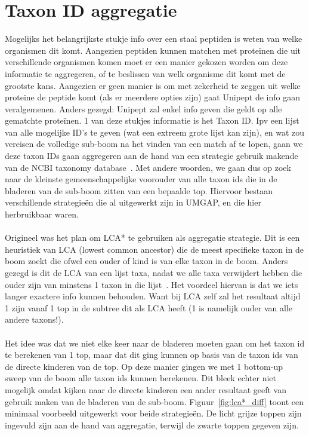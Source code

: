 \section{Taxon ID aggregatie}\label{sec:taxon-id-aggregatie}
Mogelijks het belangrijkste stukje info over een staal peptiden is weten van welke organismen dit komt.
Aangezien peptiden kunnen matchen met proteïnen die uit verschillende organismen komen moet er een manier gekozen worden om deze informatie te aggregeren, of te beslissen van welk organisme dit komt met de grootste kans.
Aangezien er geen manier is om met zekerheid te zeggen uit welke proteïne de peptide komt (als er meerdere opties zijn) gaat Unipept de info gaan veralgemenen.
Anders gezegd: Unipept zal enkel info geven die geldt op alle gematchte proteïnen.
1 van deze stukjes informatie is het Taxon ID\@.
Ipv een lijst van alle mogelijke ID's te geven (wat een extreem grote lijst kan zijn), en wat zou vereisen de volledige sub-boom na het vinden van een match af te lopen, gaan we deze taxon IDs gaan aggregeren aan de hand van een strategie gebruik makende van de NCBI taxonomy database~\cite{NCBI_original_article, NCBI_update}.
Met andere woorden, we gaan dus op zoek naar de kleinste gemeenschappelijke voorouder van alle taxon ids die in de bladeren van de sub-boom zitten van een bepaalde top.
Hiervoor bestaan verschillende strategieën die al uitgewerkt zijn in UMGAP, en die hier herbruikbaar waren.
\\ \\
Origineel was het plan om LCA* te gebruiken als aggregatie strategie.
Dit is een heuristiek van LCA (lowest common ancestor) die de meest specifieke taxon in de boom zoekt die ofwel een ouder of kind is van elke taxon in de boom.
Anders gezegd is dit de LCA van een lijst taxa, nadat we alle taxa verwijdert hebben die ouder zijn van minstens 1 taxon in die lijst~\cite{UMGAP_paper}.
Het voordeel hiervan is dat we iets langer exactere info kunnen behouden.
Want bij LCA zelf zal het resultaat altijd 1 zijn vanaf 1 top in de subtree dit als LCA heeft (1 is namelijk ouder van alle andere taxons!).
\\ \\
Het idee was dat we niet elke keer naar de bladeren moeten gaan om het taxon id te berekenen van 1 top, maar dat dit ging kunnen op basis van de taxon ids van de directe kinderen van de top.
Op deze manier gingen we met 1 bottom-up sweep van de boom alle taxon ids kunnen berekenen.
Dit bleek echter niet mogelijk omdat kijken naar de directe kinderen een ander resultaat geeft van gebruik maken van de bladeren van de sub-boom.
Figuur~\ref{fig:lca*_diff} toont een minimaal voorbeeld uitgewerkt voor beide strategieën.
De licht grijze toppen zijn ingevuld zijn aan de hand van aggregatie, terwijl de zwarte toppen gegeven zijn.

